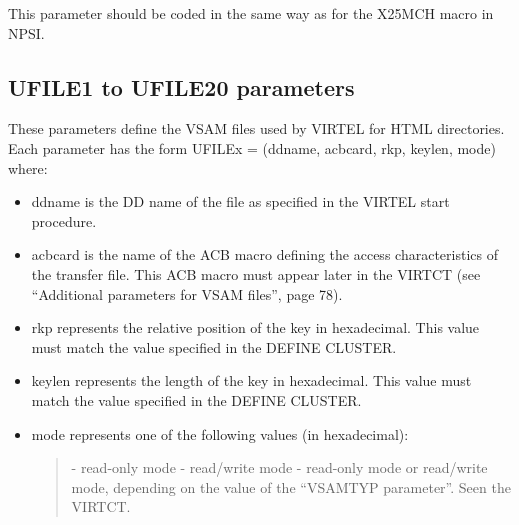 \documentclass[letterpaper,10pt,english]{sphinxmanual}
\begin{document}
This parameter should be coded in the same way as for the X25MCH macro in NPSI.


\subsection{UFILE1 to UFILE20 parameters}
\label{\detokenize{Installation_Guide:index-133}}\label{\detokenize{Installation_Guide:ufile1-to-ufile20-parameters}}
\begin{sphinxVerbatim}[commandchars=\\\{\}]
 
\end{sphinxVerbatim}

These parameters define the VSAM files used by VIRTEL for HTML directories. Each parameter has the form UFILEx = (ddname, acbcard, rkp, keylen, mode) where:
\begin{itemize}
\item {} 
ddname is the DD name of the file as specified in the VIRTEL start procedure.

\item {} 
acbcard is the name of the ACB macro defining the access characteristics of the transfer file. This ACB macro must appear later in the VIRTCT (see “Additional parameters for VSAM files”, page 78).

\item {} 
rkp represents the relative position of the key in hexadecimal. This value must match the value specified in the DEFINE CLUSTER.

\item {} 
keylen represents the length of the key in hexadecimal. This value must match the value specified in the DEFINE CLUSTER.

\item {} 
mode represents one of the following values (in hexadecimal):
\begin{quote}

 - read-only mode
 - read/write mode
 - read-only mode or read/write mode, depending on the value of the “VSAMTYP parameter”. Seen the VIRTCT.
\end{quote}

\end{itemize}
\end{document}

